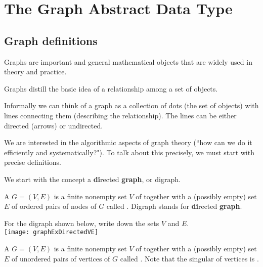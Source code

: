 \part{The Graph Abstract Data Type}
\label{ch:graphadt}


\chapter{Graph definitions} %
\label{sec:graphdefs}

Graphs are important and general mathematical objects that are widely used in theory and practice. 

Graphs distill the basic idea of a relationship among a set of objects. 

Informally we can think of a graph as a collection of dots (the set of objects) with lines connecting them (describing the relationship). 
The lines can be either directed (arrows) or undirected.


We are interested in the algorithmic aspects of graph theory (``how can we do it efficiently and systematically?").  
To talk about this precisely, we must start with precise definitions.

We start with the concept a \textbf{di}rected \textbf{graph}, or digraph. 

\begin{Definition}\label{def:digraph} 
A  $G=(V,E)$ is a  finite nonempty set $V$ of  
together with a (possibly empty) set $E$ of ordered pairs of nodes of $G$ called . 
Digraph stands for \textbf{di}rected \textbf{graph}.
\end{Definition}

\begin{Boxample}[0] \label{ex:digraph}
For the digraph shown below, write down the sets $V$ and $E$.\\
\newline 
\texttt{[image: graphExDirectedVE]}
\end{Boxample}


\begin{Definition}\label{def:graph}
A  $G = (V, E)$ is a finite nonempty  set $V$ of 
 together with a (possibly empty) set $E$ of unordered
pairs of vertices of $G$ called . 
Note that the singular of vertices is .
\end{Definition}

